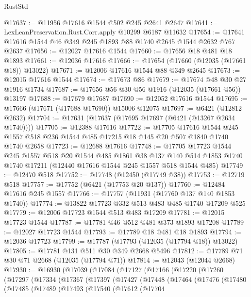 \begin{lexlean}{RustStd}
\begin{coremodule}
@17637 := @11956 @17616 @1544 @502 @245 @2641 @2647
@17641 := LexLeanPreservation.Rust.Corr.apply @10299 @6187 @11632
@17654 := @17641 @17616 @1544 @46 @349 @245 @1893 @88 @1740 @2645 @1544 @2632 @767 @2637
@17656 := @12027 @17616 @1544
@17660 := @17656 @18 @481 @18 @1893
@17661 := @12036 @17616
@17666 := @17654 (@17660 (@12035 (@17661 @18)) @13022)
@17671 := @12006 @17616 @1544 @88 @349 @2645
@17673 := @12015 @17616 @1544
@17674 := @17673 @86
@17679 := @17674 @48 @30 @27 @1916 @1734
@17687 := @17656 @56 @30 @56 @1916 (@12035 (@17661 @56)) @13197
@17688 := @17679 @17687
@17690 := @12052 @17616 @1544
@17695 := @17666 (@17671 (@17688 @17690)) @15006 @12075
@17697 := @6421 (@12812 @2632)
@17704 := @17631 (@17637 (@17695 @17697 (@6421 (@13267 @2634 @1740))))
@17705 := @12388 @17616
@17722 := @17705
    @17616
    @1544
    @245
    @1557
    @518
    @236
    @1544
    @485
    @17215
    @18
    @145
    @20
    @507
    @1840
    @1740
    @1740
    @2658
@17723 := @12688 @17616
@17748 := @17705
    @17723
    @1544
    @245
    @1557
    @518
    @20
    @1544
    @485
    @1861
    @38
    @137
    @140
    @514
    @1853
    @1740
    @1740
    @17211
    (@12440 @17616 @1544 @245 @1557 @518 @1544 @485)
@17749 := @12470 @518
@17752 := @17748 (@12450 (@17749 @38))
@17753 := @12719 @518
@17757 := @17752 (@6421 (@17753 @20 @137))
@17760 := @12484 @17616 @245 @1557
@17766 := @17757 (@11931 (@17760 @137 @140 @1853 @1740))
@17774 := @13822 @17723 @332 @513 @483 @485 @1740 @17209 @525
@17779 := @12006 @17723 @1544 @513 @483 @17209
@17781 := @12015 @17723 @1544
@17787 := @17781 @46 @512 @481 @373 @1893 @17208
@17789 := @12027 @17723 @1544
@17793 := @17789 @18 @481 @18 @1893
@17794 := @12036 @17723
@17799 := @17787 (@17793 (@12035 (@17794 @18)) @13022)
@17805 := @17781 @131 @511 @30 @349 @2668 @5496
@17812 := @17789 @71 @30 @71 @2668 (@12035 (@17794 @71))
@17814 := @12043 (@12044 @2668)
@17930 := @16930
    (@17039
      (@17084
        (@17127
          (@17166
            (@17220
              (@17260
                (@17297
                  (@17334
                    (@17367
                      (@17397
                        (@17427
                          (@17448
                            (@17464
                              (@17476
                                (@17480
                                  (@17485
                                    (@17489
                                      (@17493
                                        (@17540
                                          (@17612
                                            (@17704

\end{coremodule}
\end{lexlean}
